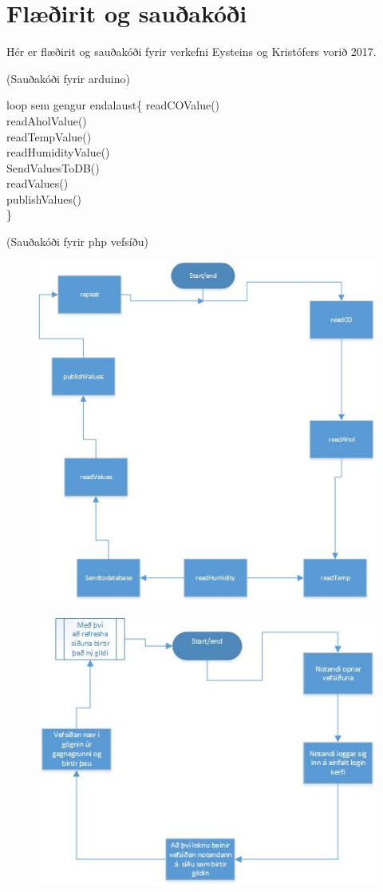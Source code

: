 \section{Flæðirit og sauðakóði} Hér er flæðirit og sauðakóði fyrir verkefni Eysteins og Kristófers vorið 2017. 
 
(Sauðakóði fyrir arduino)

loop sem gengur endalaust\{
  readCOValue()\\
  readAholValue()\\
  readTempValue()\\
  readHumidityValue()\\
  
  SendValuesToDB()\\
  readValues()\\
  publishValues()\\
\}

(Sauðakóði fyrir php vefsíðu)




\begin{figure}[h]
\includegraphics[scale=.3]{img/Fchatarduinomynd}
\end{figure}

\begin{figure}[h]
\includegraphics[scale=.3]{img/Fchatphpwebmynd}
\end{figure}

